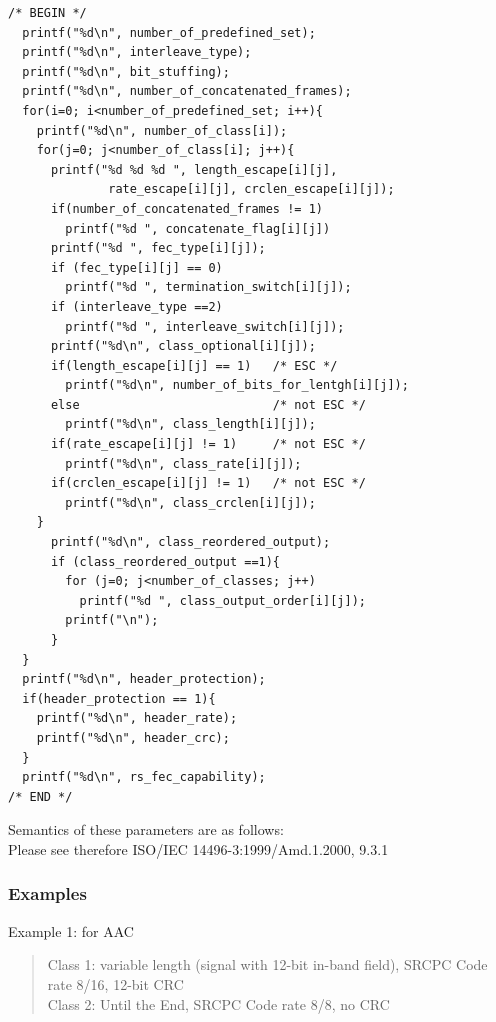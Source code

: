 \documentclass[a4paper]{article}
\begin{document}
\begin{verbatim}
/* BEGIN */
  printf("%d\n", number_of_predefined_set);
  printf("%d\n", interleave_type);
  printf("%d\n", bit_stuffing);
  printf("%d\n", number_of_concatenated_frames);      
  for(i=0; i<number_of_predefined_set; i++){
    printf("%d\n", number_of_class[i]);
    for(j=0; j<number_of_class[i]; j++){
      printf("%d %d %d ", length_escape[i][j], 
              rate_escape[i][j], crclen_escape[i][j]);
      if(number_of_concatenated_frames != 1)
        printf("%d ", concatenate_flag[i][j])
      printf("%d ", fec_type[i][j]);
      if (fec_type[i][j] == 0)
        printf("%d ", termination_switch[i][j]);
      if (interleave_type ==2)
        printf("%d ", interleave_switch[i][j]);
      printf("%d\n", class_optional[i][j]);            
      if(length_escape[i][j] == 1)   /* ESC */
        printf("%d\n", number_of_bits_for_lentgh[i][j]);
      else                           /* not ESC */
        printf("%d\n", class_length[i][j]);
      if(rate_escape[i][j] != 1)     /* not ESC */
        printf("%d\n", class_rate[i][j]);
      if(crclen_escape[i][j] != 1)   /* not ESC */
        printf("%d\n", class_crclen[i][j]);
    }
      printf("%d\n", class_reordered_output);
      if (class_reordered_output ==1){
        for (j=0; j<number_of_classes; j++)
          printf("%d ", class_output_order[i][j]);
        printf("\n");     
      }      
  }
  printf("%d\n", header_protection);
  if(header_protection == 1){
    printf("%d\n", header_rate);
    printf("%d\n", header_crc);
  }
  printf("%d\n", rs_fec_capability);
/* END */
\end{verbatim} 

  Semantics of these parameters are as follows:\\
  Please see therefore ISO/IEC 14496-3:1999/Amd.1.2000, 9.3.1
    
\subsubsection{Examples}
  Example 1: for AAC 
\begin{quote}
  Class 1:  variable length (signal with 12-bit in-band field), SRCPC
  Code rate 8/16, 12-bit CRC \\
  Class 2:  Until the End, SRCPC Code rate 8/8, no CRC
\end{quote}
\end{document}
